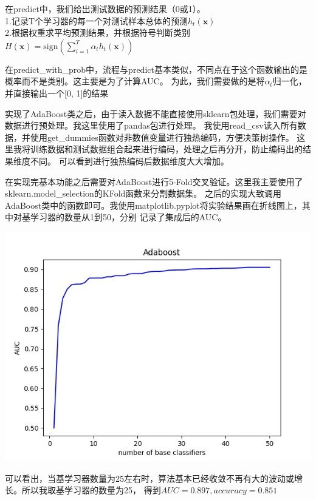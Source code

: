 \documentclass{article}
\begin{document}
        在predict中，我们给出测试数据的预测结果（0或1）。\\
        1.记录T个学习器的每一个对测试样本总体的预测$h_t(\boldsymbol{x} )$\\
        2.根据权重求平均预测结果，并根据符号判断类别$H(\boldsymbol{x})=\text{sign}  (\sum_{i=1}^T \alpha_t h_t(\boldsymbol{x} ))$

        在predict\_with\_prob中，流程与predict基本类似，不同点在于这个函数输出的是概率而不是类别。这主要是为了计算AUC。
        为此，我们需要做的是将$\alpha_t$归一化，并直接输出一个[0, 1]的结果

        实现了AdaBoost类之后，由于读入数据不能直接使用sklearn包处理，我们需要对数据进行预处理。我这里使用了pandas包进行处理。
        我使用read\_csv读入所有数据，并使用get\_dummies函数对非数值变量进行独热编码，方便决策树操作。
        这里我将训练数据和测试数据组合起来进行编码，处理之后再分开，防止编码出的结果维度不同。
        可以看到进行独热编码后数据维度大大增加。

        在实现完基本功能之后需要对AdaBoost进行5-Fold交叉验证。这里我主要使用了sklearn.model\_selection的KFold函数来分割数据集。
        之后的实现大致调用AdaBoost类中的函数即可。我使用matplotlib.pyplot将实验结果画在折线图上，其中对基学习器的数量从1到50，分别
        记录了集成后的AUC。

        {\centering
        \includegraphics[scale=0.6]{Adaboost.jpg}}

        可以看出，当基学习器数量为25左右时，算法基本已经收敛不再有大的波动或增长。所以我取基学习器的数量为25，
        得到$AUC=0.897, accuracy=0.851$
\end{document}
